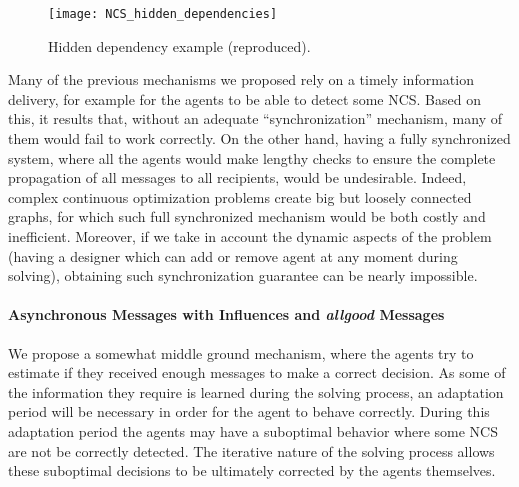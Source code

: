 \begin{figure}
\centering
\texttt{[image: NCS\_hidden\_dependencies]}
\caption{Hidden dependency example (reproduced).}\label{NCS_async_requests}
\end{figure}

Many of the previous mechanisms we proposed rely on a timely information delivery, for example for the agents to be able to detect some NCS. Based on this, it results that, without an adequate \enquote{synchronization} mechanism, many of them would fail to work correctly. On the other hand, having a fully synchronized system, where all the agents would make lengthy checks to ensure the complete propagation of all messages to all recipients, would be undesirable. Indeed, complex continuous optimization problems create big but loosely connected graphs, for which such full synchronized mechanism would be both costly and inefficient. Moreover, if we take in account the dynamic aspects of the problem (having a designer which can add or remove agent at any moment during solving), obtaining such synchronization guarantee can be nearly impossible.

\paragraph*{Asynchronous Messages with Influences and \emph{allgood} Messages}
We propose a somewhat middle ground mechanism, where the agents try to estimate if they received enough messages to make a correct decision. As some of the information they require is learned during the solving process, an adaptation period will be necessary in order for the agent to behave correctly. During this adaptation period the agents may have a suboptimal behavior where some NCS are not be correctly detected. The iterative nature of the solving process allows these suboptimal decisions to be ultimately corrected by the agents themselves.

